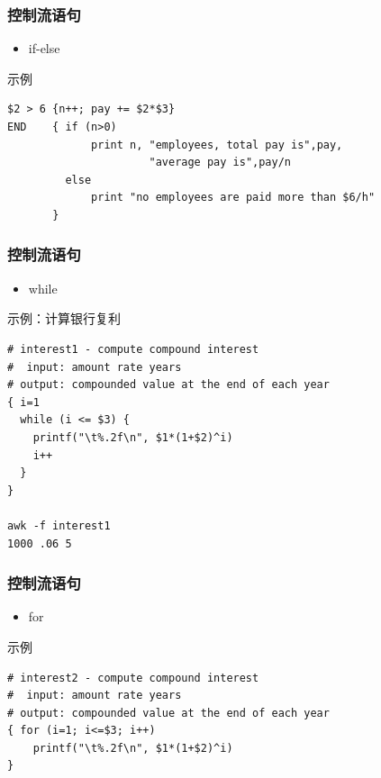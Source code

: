 \documentclass[xcolor=svgnames,presentation]{beamer}
\begin{document}
\begin{frame}[fragile]
\frametitle{控制流语句}
\label{sec-2-2-18}
\begin{itemize}

\item if-else
\label{sec-2-2-18-1}%
\end{itemize} %
\begin{exampleblock}{示例}
\label{sec-2-2-18-2}


\begin{verbatim}
$2 > 6 {n++; pay += $2*$3}
END    { if (n>0)
             print n, "employees, total pay is",pay,
                      "average pay is",pay/n
         else
             print "no employees are paid more than $6/h"
       }
\end{verbatim}
\end{exampleblock}
\end{frame}
\begin{frame}[fragile]
\frametitle{控制流语句}
\label{sec-2-2-19}
\begin{itemize}

\item while
\label{sec-2-2-19-1}%
\end{itemize} %
\begin{exampleblock}{示例：计算银行复利}
\label{sec-2-2-19-2}


\begin{verbatim}
# interest1 - compute compound interest
#  input: amount rate years
# output: compounded value at the end of each year
{ i=1
  while (i <= $3) {
    printf("\t%.2f\n", $1*(1+$2)^i)
    i++
  }
}

awk -f interest1
1000 .06 5
\end{verbatim}
\end{exampleblock}
\end{frame}
\begin{frame}[fragile]
\frametitle{控制流语句}
\label{sec-2-2-20}
\begin{itemize}

\item for
\label{sec-2-2-20-1}%
\end{itemize} %
\begin{exampleblock}{示例}
\label{sec-2-2-20-2}


\begin{verbatim}
# interest2 - compute compound interest
#  input: amount rate years
# output: compounded value at the end of each year
{ for (i=1; i<=$3; i++)
    printf("\t%.2f\n", $1*(1+$2)^i)
}
\end{verbatim}
\end{exampleblock}
\end{frame}
\end{document}
